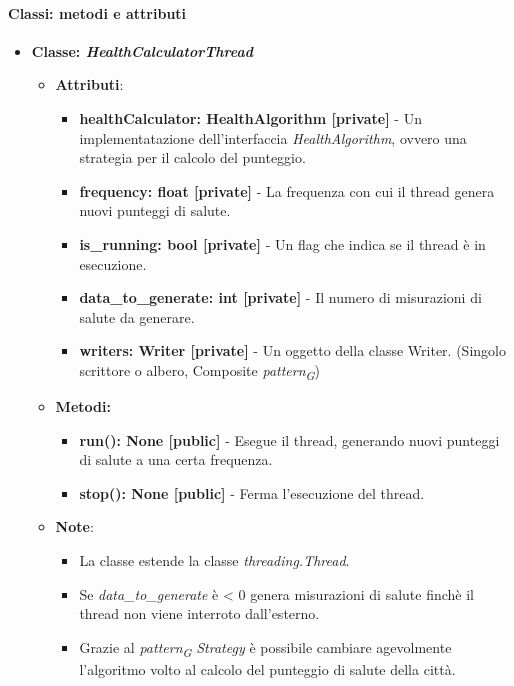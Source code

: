 \paragraph*{Classi: metodi e attributi}
\begin{itemize}
    \item{\textbf{Classe: \textit{HealthCalculatorThread}}}
    \begin{itemize}
    \item\textbf{Attributi}:
        \begin{itemize}
        \item \textbf{healthCalculator: HealthAlgorithm [private]} - Un implementatazione dell'interfaccia \textit{HealthAlgorithm}, ovvero una strategia per il calcolo del punteggio.
        \item \textbf{frequency: float [private]} - La frequenza con cui il thread genera nuovi punteggi di salute.
        \item \textbf{is\_running: bool [private]} - Un flag che indica se il thread è in esecuzione.
        \item \textbf{data\_to\_generate: int [private]} - Il numero di misurazioni di salute da generare.
        \item \textbf{writers: Writer [private]} - Un oggetto della classe Writer. (Singolo scrittore o albero, Composite \textit{pattern}\textsubscript{\textit{G}})
    \end{itemize}
    \item \textbf{Metodi: }
    \begin{itemize}
        \item \textbf{run(): None [public]} - Esegue il thread, generando nuovi punteggi di salute a una certa frequenza.
        \item \textbf{stop(): None [public]} - Ferma l'esecuzione del thread.
    \end{itemize}
    \item\textbf{Note}:
        \begin{itemize}
            \item La classe estende la classe \textit{threading.Thread}.
            \item Se \textit{data\_to\_generate} è < 0 genera misurazioni di salute finchè il thread non viene interroto dall'esterno.
            \item   Grazie al \textit{pattern}\textsubscript{\textit{G}} \textit{Strategy} è possibile cambiare agevolmente l'algoritmo volto al calcolo del punteggio di salute della città.
        \end{itemize}
    \end{itemize}
\end{itemize}

